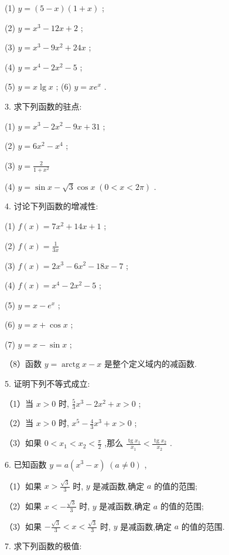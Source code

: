 \documentclass[10pt]{article}
\begin{document}
(1) \(y = \left( {5 - x}\right) \left( {1 + x}\right)\) ;

(2) \(y = {x}^{3} - {12x} + 2\) ;

(3) \(y = {x}^{3} - 9{x}^{2} + {24x}\) ;

(4) \(y = {x}^{4} - 2{x}^{2} - 5\) ;

(5) \(y = x\lg x\) ; (6) \(y = x{e}^{x}\) .

3. 求下列函数的驻点:

(1) \(y = {x}^{3} - 2{x}^{2} - {9x} + {31}\) ;

(2) \(y = 6{x}^{2} - {x}^{4}\) ;

(3) \(y = \frac{2}{1 + {x}^{2}}\)

(4) \(y = \sin x - \sqrt{3}\cos x\;\left( {0 < x < {2\pi }}\right)\) .

4. 讨论下列函数的增减性:

(1) \(f\left( x\right) = 7{x}^{2} + {14x} + 1\) ;

(2) \(f\left( x\right) = \frac{1}{3x}\)

(3) \(f\left( x\right) = 2{x}^{3} - 6{x}^{2} - {18x} - 7\) ;

(4) \(f\left( x\right) = {x}^{4} - 2{x}^{2} - 5\) ;

(5) \(y = x - {e}^{x}\) ;

(6) \(y = x + \cos x\) ;

(7) \(y = x - \sin x\) ;

（8）函数 \(y = \operatorname{arctg}x - x\) 是整个定义域内的减函数.

5. 证明下列不等式成立:

（1）当 \(x > 0\) 时, \(\frac{5}{3}{x}^{3} - 2{x}^{2} + x > 0\) ;

（2）当 \(x > 0\) 时, \({x}^{5} - \frac{4}{3}{x}^{3} + x > 0\) ;

（3）如果 \(0 < {x}_{1} < {x}_{2} < \frac{\pi }{2}\) ,那么 \(\frac{\operatorname{tg}{x}_{1}}{{x}_{1}} < \frac{\operatorname{tg}{x}_{2}}{{x}_{2}}\) .

6. 已知函数 \(y = a\left( {{x}^{3} - x}\right) \;\left( {a \neq 0}\right)\) ,

（1）如果 \(x > \frac{\sqrt{3}}{3}\) 时, \(y\) 是减函数,确定 \(a\) 的值的范围;

（2）如果 \(x < - \frac{\sqrt{3}}{3}\) 时, \(y\) 是减函数,确定 \(a\) 的值的范围;

（3）如果 \(- \frac{\sqrt{3}}{3} < x < \frac{\sqrt{3}}{3}\) 时, \(y\) 是减函数,确定 \(a\) 的值的范围.

7. 求下列函数的极值:
\end{document}
